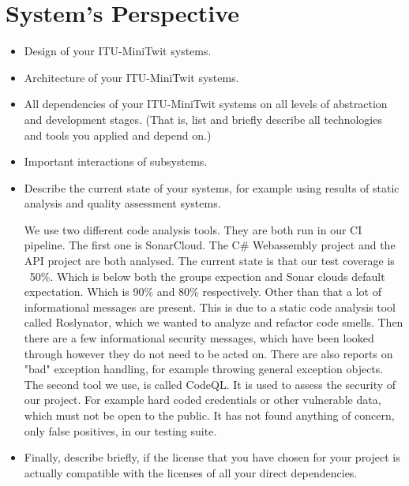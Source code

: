 \section{System's Perspective}

\begin{itemize}
  \item Design of your ITU-MiniTwit systems.
  \item Architecture of your ITU-MiniTwit systems.
  \item All dependencies of your ITU-MiniTwit systems on all levels of abstraction and development stages. (That is, list and briefly describe all technologies and tools you applied and depend on.)
  \item Important interactions of subsystems.
  \item Describe the current state of your systems, for example using results of static analysis and quality assessment systems.

        We use two different code analysis tools. 
        They are both run in our CI pipeline. 
        The first one is SonarCloud. The C\# Webassembly project and the API project are both analysed. 
        The current state is that our test coverage is ~50\%. Which is below both the groups expection and Sonar clouds default expectation. 
        Which is 90\% and 80\% respectively. 
        Other than that a lot of informational messages are present. 
        This is due to a static code analysis tool called Roslynator, which we wanted to analyze and refactor code smells. 
        Then there are a few informational security messages, which have been looked through however they do not need to be acted on. 
        There are also reports on "bad" exception handling, for example throwing general exception objects.
        The second tool we use, is called CodeQL. It is used to assess the security of our project.
        For example hard coded credentials or other vulnerable data, which must not be open to the public.
        It has not found anything of concern, only false positives, in our testing suite.
  \item Finally, describe briefly, if the license that you have chosen for your project is actually compatible with the licenses of all your direct dependencies.
  
\end{itemize}
